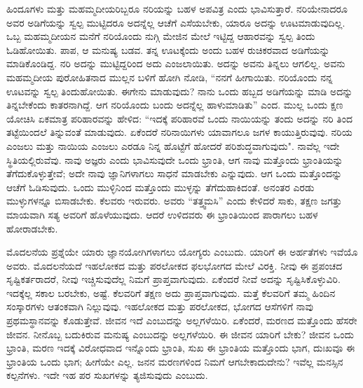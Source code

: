 ಹಿಂದೂಗಳು ಮತ್ತು ಮಹಮ್ಮದೀಯರಿಬ್ಬರೂ ನರಿಯನ್ನು ಬಹಳ ಅಪವಿತ್ರ ಎಂದು ಭಾವಿಸುತ್ತಾರೆ. ನರಿಯೇನಾದರೂ ಅವರ ಅಡಿಗೆಯನ್ನು ಸ್ವಲ್ಪ ಮುಟ್ಟಿದರೂ ಅದನ್ನೆಲ್ಲ ಆಚೆಗೆ ಎಸೆಯಬೇಕು, ಯಾರೂ ಅದನ್ನು ಊಟಮಾಡುವುದಿಲ್ಲ. ಒಬ್ಬ ಮಹಮ್ಮದೀಯನ ಮನೆಗೆ ನರಿಯೊಂದು ನುಗ್ಗಿ ಮೇಜಿನ ಮೇಲೆ ಇಟ್ಟಿದ್ದ ಆಹಾರವನ್ನು ಸ್ವಲ್ಪ ತಿಂದು ಓಡಿಹೋಯಿತು. ಪಾಪ, ಆ ಮನುಷ್ಯ ಬಡವ. ತನ್ನ ಊಟಕ್ಕೆಂದು ಅಂದು ಬಹಳ ರುಚಿಕರವಾದ ಅಡಿಗೆಯನ್ನು ಮಾಡಿಕೊಂಡಿದ್ದ. ನರಿ ಅದನ್ನು ಮುಟ್ಟಿದ್ದರಿಂದ ಅದು ಎಂಜಲಾಯಿತು. ಅದನ್ನು ಅವನು ತಿನ್ನಲು ಆಗಲಿಲ್ಲ. ಅವನು ಮಹಮ್ಮದೀಯ ಪುರೋಹಿತನಾದ ಮುಲ್ಲನ ಬಳಿಗೆ ಹೋಗಿ ನೋಡಿ, “ನನಗೆ ಹೀಗಾಯಿತು. ನರಿಯೊಂದು ನನ್ನ ಊಟವನ್ನು ಸ್ವಲ್ಪ ತಿಂದುಹೋಯಿತು. ಈಗೇನು ಮಾಡುವುದು? ನಾನು ಒಂದು ಹಬ್ಬದ ಅಡಿಗೆಯನ್ನು ಮಾಡಿ ಅದನ್ನು ತಿನ್ನಬೇಕೆಂದು ಕಾತರನಾಗಿದ್ದೆ. ಆಗ ನರಿಯೊಂದು ಬಂದು ಅದನ್ನೆಲ್ಲ ಹಾಳುಮಾಡಿತು'' ಎಂದ. ಮುಲ್ಲ ಒಂದು ಕ್ಷಣ ಯೋಚಿಸಿ ಏಕಮಾತ್ರ ಪರಿಹಾರವನ್ನು ಹೇಳಿದ: “ಇದಕ್ಕೆ ಪರಿಹಾರವೆ ಒಂದು ನಾಯಿಯನ್ನು ತಂದು ಅದನ್ನು ನರಿ ತಿಂದ ತಟ್ಟೆಯಿಂದಲೆ ತಿನ್ನುವಂತೆ ಮಾಡುವುದು. ಏಕೆಂದರೆ ನರಿನಾಯಿಗಳು ಯಾವಾಗಲೂ ಜಗಳ ಕಾಯುತ್ತಿರುವುವು. ನರಿಯ ಎಂಜಲು ಮತ್ತು ನಾಯಿಯ ಎಂಜಲು ಎರಡೂ ನಿನ್ನ ಹೊಟ್ಟೆಗೆ ಹೋದರೆ ಪರಿಶುದ್ಧವಾಗುವುದು". ನಾವೆಲ್ಲ ಇದೇ ಸ್ಥಿತಿಯಲ್ಲಿರುವೆವು. ನಾವು ಅಜ್ಞರು ಎಂದು ಭಾವಿಸುವುದೇ ಒಂದು ಭ್ರಾಂತಿ, ಆಗ ನಾವು ಮತ್ತೊಂದು ಭ್ರಾಂತಿಯನ್ನು ತೆಗೆದುಕೊಳ್ಳುತ್ತೇವೆ; ಅದೇ ನಾವು ಜ್ಞಾನಿಗಳಾಗಲು ಸಾಧನೆ ಮಾಡಬೇಕು ಎನ್ನುವುದು. ಆಗ ಒಂದು ಮತ್ತೊಂದನ್ನು ಆಚೆಗೆ ಓಡಿಸುವುದು. ಒಂದು ಮುಳ್ಳಿನಿಂದ ಮತ್ತೊಂದು ಮುಳ್ಳನ್ನು ತೆಗೆದುಹಾಕಿದಂತೆ. ಅನಂತರ ಎರಡು ಮುಳ್ಳುಗಳನ್ನೂ ಬಿಸಾಡಬೇಕು. ಕೆಲವರು ಇರುವರು. ಅವರು “ತತ್ತ್ವಮಸಿ'' ಎಂದು ಕೇಳಿದರೆ ಸಾಕು, ತಕ್ಷಣ ಜಗತ್ತು ಮಾಯವಾಗಿ ಸತ್ಯ ಅವರಿಗೆ ಹೊಳೆಯುವುದು. ಆದರೆ ಉಳಿದವರು ಈ ಭ್ರಾಂತಿಯಿಂದ ಪಾರಾಗಲು ಬಹಳ ಹೋರಾಡಬೇಕು.

ಮೊದಲನೆಯ ಪ್ರಶ್ನೆಯೇ ಯಾರು ಜ್ಞಾನಯೋಗಿಗಳಾಗಲು ಯೋಗ್ಯರು ಎಂಬುದು. ಯಾರಿಗೆ ಈ ಅರ್ಹತೆಗಳು ಇವೆಯೊ ಅವರು. ಮೊದಲನೆಯದೆ ಇಹಲೋಕದ ಮತ್ತು ಪರಲೋಕದ ಫಲಭೋಗದ ಮೇಲೆ ವಿರಕ್ತಿ. ನೀವು ಈ ಪ್ರಪಂಚದ ಸೃಷ್ಟಿಕರ್ತರಾದರೆ, ನೀವು ಇಚ್ಚಿಸುವುದೆಲ್ಲ ನಿಮಗೆ ಪ್ರಾಪ್ತವಾಗುವುದು. ಏಕೆಂದರೆ ನೀವೆ ಅದನ್ನು ಸೃಷ್ಟಿಸಿಕೊಳ್ಳುವಿರಿ. ಇದಕ್ಕೆಲ್ಲ ಸಕಾಲ ಬರಬೇಕು, ಅಷ್ಟೆ. ಕೆಲವರಿಗೆ ತಕ್ಷಣ ಅದು ಪ್ರಾಪ್ತವಾಗುವುದು. ಮತ್ತೆ ಕೆಲವರಿಗೆ ತಮ್ಮ ಹಿಂದಿನ ಸಂಸ್ಕಾರಗಳು ಆತಂಕವಾಗಿ ನಿಲ್ಲುವುವು. ಇಹಲೋಕದ ಮತ್ತು ಪರಲೋಕದ, ಭೋಗದ ಆಸೆಗಳಿಗೆ ನಾವು ಪ್ರಥಮಸ್ಥಾನವನ್ನು ಕೊಡುತ್ತೇವೆ. ಜೀವನ ಇದೆ ಎಂಬುದನ್ನು ಅಲ್ಲಗಳೆಯಿರಿ. ಏಕೆಂದರೆ, ಮರಣದ ಮತ್ತೊಂದು ಹೆಸರೇ ಜೀವನ. ನೀನೊಬ್ಬ ಬದುಕಿರುವ ಮನುಷ್ಯ ಎಂಬುದನ್ನು ಅಲ್ಲಗಳೆಯಿರಿ. ಈ ಜೀವನ ಯಾರಿಗೆ ಬೇಕು? ಜೀವನ ಒಂದು ಭ್ರಾಂತಿ, ಮರಣ ಇದಕ್ಕೆ ವಿರೋಧವಾದ ಇನ್ನೊಂದು ಭ್ರಾಂತಿ, ಸುಖ ಈ ಭ್ರಾಂತಿಯ ಮತ್ತೊಂದು ಭಾಗ, ದುಃಖವೂ ಈ ಭ್ರಾಂತಿಯ ಒಂದು ಭಾಗ; ಹೀಗೆಯೇ ಎಲ್ಲ. ಜನನ ಮರಣಗಳಿಂದ ನಿಮಗೆ ಆಗಬೇಕಾದುದೇನು? ಇವೆಲ್ಲ ಮನಸ್ಸಿನ ಕಲ್ಪನೆಗಳು. ಇದೇ ಇಹ ಪರ ಸುಖಗಳನ್ನು ತ್ಯಜಿಸುವುದು ಎಂಬುದು.

